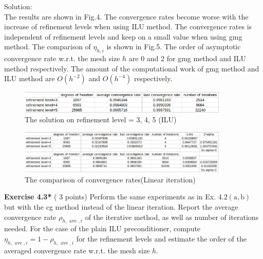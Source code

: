 \documentclass[a4paper]{article}
\begin{document}
\noindent Solution:\\
\noindent The results are shown in Fig.4. The convergence rates become worse with the increase of refinement levels when using ILU method. The convergence rates is independent of refinement levels and keep on a small value when using gmg method. The comparison of $\eta_{h, i}$ is shown in Fig.5. The order of asymptotic convergence rate w.r.t. the mesh size $h$ are 0 and 2 for gmg method and ILU method respectively. The amount of the computational work of gmg method and ILU method are $O\left(h^{-2}\right)$ and $O\left(h^{-4}\right)$ respectively.\\
\begin{figure}[htbp]
	\centering
	\begin{minipage}[t]{0.7\textwidth}
		\centering		\includegraphics[width=10cm]{5.png}
		\caption{The solution on refinement level = 3, 4, 5 (ILU)}
	\end{minipage}
\end{figure}

\begin{figure}[htbp]
	\centering
	\begin{minipage}[t]{0.7\textwidth}
		\centering		\includegraphics[width=10cm]{6.png}
		\caption{The comparison of convergence rates(Linear iteration)}
	\end{minipage}
\end{figure}

\noindent \textbf{Exercise 4.3*} ( 3 points) Perform the same experiments as in Ex. $4.2(\mathrm{a}, \mathrm{b})$ but with the cg method instead of the linear iteration. Report the average convergence rate $\rho_{h, \text { ave }, i}$ of the iterative method, as well as number of iterations needed. For the case of the plain ILU preconditioner, compute $\eta_{h, \text { ave }, i}=1-\rho_{h, \text { ave }, i}$ for the refinement levels and estimate the order of the averaged convergence rate w.r.t. the mesh size $h$.\\
\end{document}
